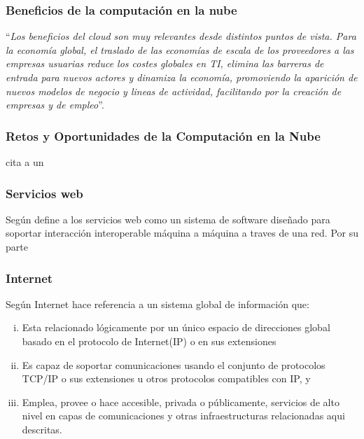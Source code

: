 \subsubsection{Beneficios de la computaci\'on en la nube}
``\emph{Los beneficios del cloud son muy relevantes desde distintos puntos de vista.
Para la econom\'ia global, el traslado de las econom\'ias de escala de los
proveedores a las empresas usuarias reduce los costes globales en TI, elimina
las barreras de entrada para nuevos actores y dinamiza la econom\'ia, promoviendo
la aparici\'on de nuevos modelos de negocio y lineas de actividad, facilitando
por la creaci\'on de empresas y de empleo}''\citep{cierco}.

\subsubsection{Retos y Oportunidades de la Computaci\'on en la Nube}
\cite{joyanes} cita a un

\subsubsection{Servicios web}

Seg\'un \cite{w3c} define a los servicios web como un sistema de software dise\~nado
para soportar interacci\'on interoperable m\'aquina a m\'aquina a traves de una red.
Por su parte
\subsubsection{Internet}
Seg\'un \cite{fnc} Internet hace referencia a un sistema global de informaci\'on que:
\begin{enumerate}[i.]
    \item Esta relacionado l\'ogicamente por un \'unico espacio de direcciones
          global basado en el protocolo de Internet(IP) o en sus extensiones
    \item Es capaz de soportar comunicaciones usando el conjunto de protocolos TCP/IP
          o sus extensiones u otros protocolos compatibles con IP, y
    \item Emplea, provee o hace accesible, privada o p\'ublicamente, servicios de
          alto nivel en capas de comunicaciones y otras infraestructuras relacionadas
          aqui descritas.
\end{enumerate}
